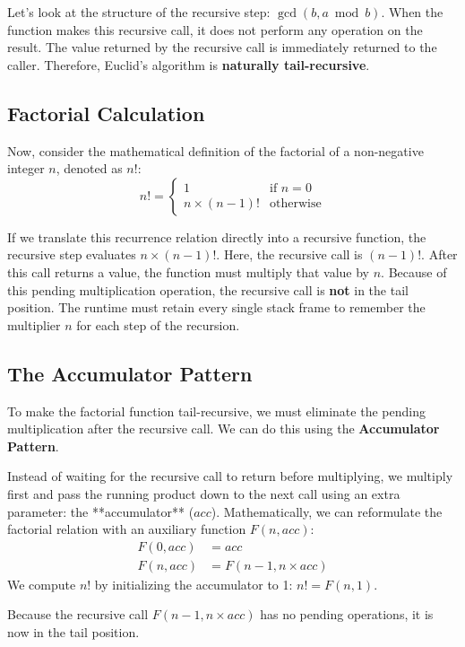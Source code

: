 Let's look at the structure of the recursive step: $\gcd(b, a \bmod b)$. When the function makes this recursive call, it does not perform any operation on the result. The value returned by the recursive call is immediately returned to the caller. Therefore, Euclid's algorithm is \textbf{naturally tail-recursive}.

\subsection{Factorial Calculation}

Now, consider the mathematical definition of the factorial of a non-negative integer $n$, denoted as $n!$:
\[
n! = 
\begin{cases} 
1 & \text{if } n = 0 \\ 
n \times (n - 1)! & \text{otherwise} 
\end{cases}
\]

If we translate this recurrence relation directly into a recursive function, the recursive step evaluates $n \times (n-1)!$. 
Here, the recursive call is $(n-1)!$. After this call returns a value, the function must multiply that value by $n$. Because of this pending multiplication operation, the recursive call is \textbf{not} in the tail position. The runtime must retain every single stack frame to remember the multiplier $n$ for each step of the recursion.

\subsection{The Accumulator Pattern}

To make the factorial function tail-recursive, we must eliminate the pending multiplication after the recursive call. We can do this using the \textbf{Accumulator Pattern}.

Instead of waiting for the recursive call to return before multiplying, we multiply first and pass the running product down to the next call using an extra parameter: the **accumulator** ($acc$). 
Mathematically, we can reformulate the factorial relation with an auxiliary function $F(n, acc)$:
\begin{align*}
F(0, acc) &= acc \\
F(n, acc) &= F(n - 1, n \times acc)
\end{align*}
We compute $n!$ by initializing the accumulator to 1: $n! = F(n, 1)$.

Because the recursive call $F(n - 1, n \times acc)$ has no pending operations, it is now in the tail position.


